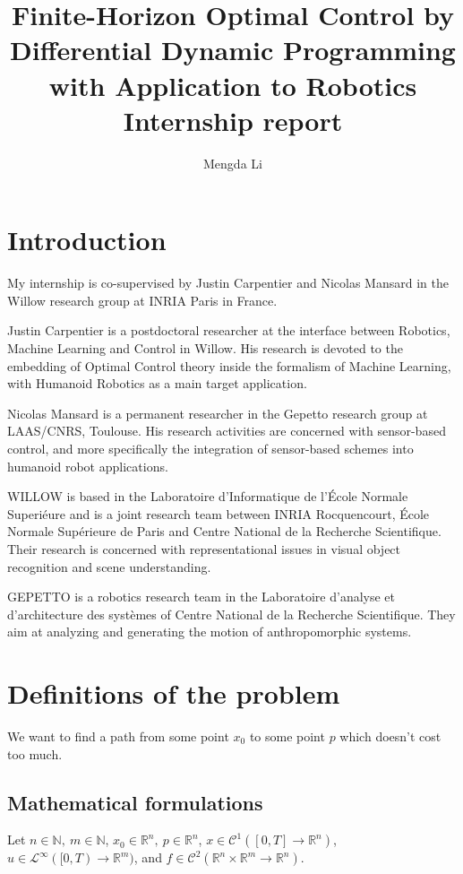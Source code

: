 \documentclass{report}
\title{Finite-Horizon Optimal Control by Differential Dynamic Programming with Application to Robotics 	\\
\medskip
\large Internship report
}
\author{Mengda Li }
\begin{document}
\maketitle
\tableofcontents

\chapter*{Introduction}
My internship is co-supervised by Justin Carpentier and Nicolas Mansard in the Willow research group at INRIA Paris in France. 

Justin Carpentier is a postdoctoral researcher at the interface between Robotics, Machine Learning and Control in Willow. His research is devoted to the embedding of Optimal Control theory inside the formalism of Machine Learning, with Humanoid Robotics as a main target application.  

Nicolas Mansard is a permanent researcher in the Gepetto research group at LAAS/CNRS, Toulouse. His research activities are concerned with sensor-based control, and more specifically the integration of sensor-based schemes into humanoid robot applications. 

WILLOW is based in the Laboratoire d'Informatique de l'École Normale Superiéure and is a joint research team between INRIA Rocquencourt, École Normale Supérieure de Paris and Centre National de la Recherche Scientifique. 
Their research is concerned with representational issues in visual object recognition and scene understanding. 

GEPETTO is a robotics research team in the Laboratoire d'analyse et d'architecture des systèmes of Centre National de la Recherche Scientifique. They aim at analyzing and generating the motion of anthropomorphic systems. 

\chapter{Definitions of the problem}
We want to find a path from some point $x_0$ to some point $p$ which doesn't cost too much.

\section{Mathematical formulations}
Let $n\in \mathbb{N}, \ m \in \mathbb{N}$, $x_0\in \mathbb{R}^n, \ p \in \mathbb{R}^n$, $x \in \mathscr{C}^1([0, T] \to \mathbb{R}^n)$, $u \in \mathscr{L}^\infty([0, T) \to \mathbb{R}^m)$, and $f \in  \mathscr{C}^2(\mathbb{R}^n \times \mathbb{R}^m \to \mathbb{R}^n)$. 
\end{document}
